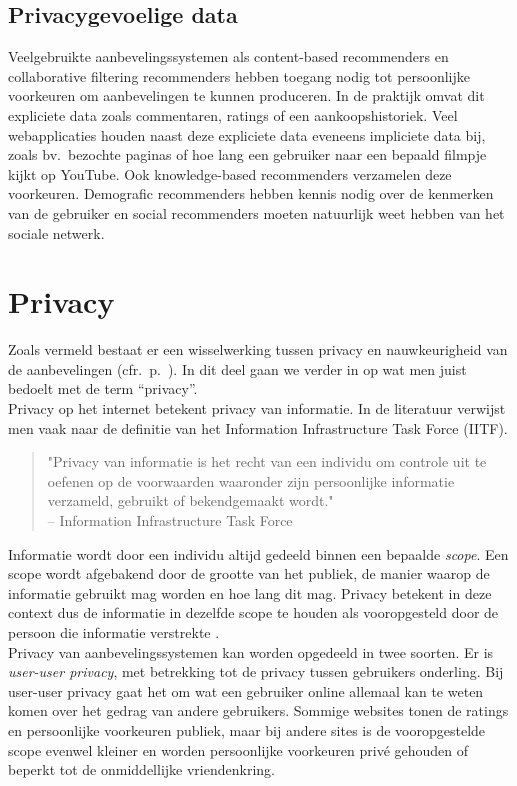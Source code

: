 \subsection{Privacygevoelige data}
Veelgebruikte aanbevelingssystemen als content-based recommenders en collaborative filtering recommenders hebben toegang nodig tot persoonlijke voorkeuren om aanbevelingen te kunnen produceren. In de praktijk omvat dit expliciete data zoals commentaren, ratings of een aankoopshistoriek. Veel webapplicaties houden naast deze expliciete data eveneens impliciete data bij, zoals bv.~bezochte paginas of hoe lang een gebruiker naar een bepaald filmpje kijkt op YouTube. Ook knowledge-based recommenders verzamelen deze voorkeuren. Demografic recommenders hebben kennis nodig over de kenmerken van de gebruiker en social recommenders moeten natuurlijk weet hebben van het sociale netwerk.

\section{Privacy}
\label{sec:privacy}
Zoals vermeld bestaat er een wisselwerking tussen privacy en nauwkeurigheid van de aanbevelingen (cfr.~p.~\pageref{sec:inleiding}). In dit deel gaan we verder in op wat men juist bedoelt met de term ``privacy''.\\

Privacy op het internet betekent privacy van informatie. In de literatuur verwijst men vaak naar de definitie van het Information Infrastructure Task Force (IITF).

 \begin{quotation}
"Privacy van informatie is het recht van een individu om controle uit te oefenen op de voorwaarden waaronder zijn persoonlijke informatie verzameld, gebruikt of bekendgemaakt wordt." \\-- Information Infrastructure Task Force \cite{pirs}
 \end{quotation}

Informatie wordt door een individu altijd gedeeld binnen een bepaalde \textit{scope}. Een scope wordt afgebakend door de grootte van het publiek, de manier waarop de informatie gebruikt mag worden en hoe lang dit mag.  Privacy betekent in deze context dus de informatie in dezelfde scope te houden als vooropgesteld door de persoon die informatie verstrekte \cite{pirs}.\\

Privacy van aanbevelingssystemen kan worden opgedeeld in twee soorten. Er is \textit{user-user privacy}, met betrekking tot de privacy tussen gebruikers onderling. Bij user-user privacy gaat het om wat een gebruiker online allemaal kan te weten komen over het gedrag van andere gebruikers. Sommige websites tonen de ratings en persoonlijke voorkeuren publiek, maar bij andere sites is de vooropgestelde scope evenwel kleiner en worden persoonlijke voorkeuren priv\'e gehouden of beperkt tot de onmiddellijke vriendenkring.

